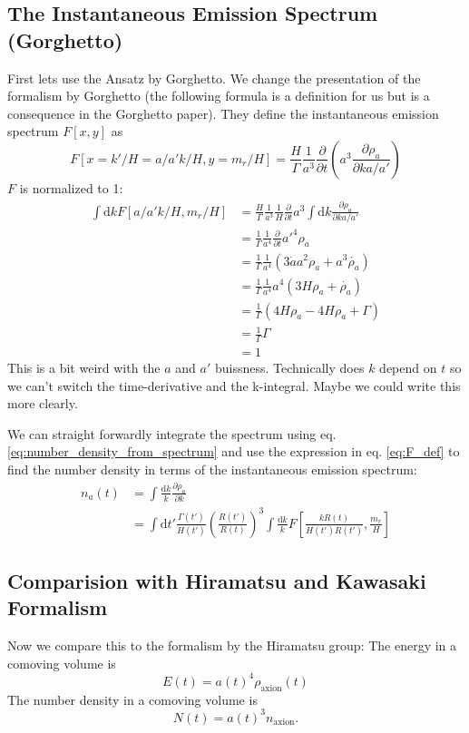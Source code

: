 \documentclass[a4paper]{article}
\begin{document}
\subsection{The Instantaneous Emission Spectrum (Gorghetto)}
First lets use the Ansatz by Gorghetto. 
We change the presentation of the formalism by Gorghetto (the following formula is a definition for us but is a consequence in the Gorghetto paper).
They define the instantaneous emission spectrum $F[x,y]$ as
\begin{equation}
	\label{eq:F_def}
	F[x = k' / H = a/a' k / H, y = m_r / H] = \frac{H}{\Gamma} \frac{1}{a^3} \frac{\partial}{\partial t} \left( a^3 \frac{\partial \rho_a}{\partial k a / a'} \right)
\end{equation}
$F$ is normalized to 1:
\begin{align}
	\int \mathrm{d} k F[a/a'k/H, m_r/H] &= \frac{H}{\Gamma} \frac{1}{a^3} \frac{1}{H} \frac{\partial}{\partial t} a^3 \int \mathrm{d} k \frac{\partial \rho_a}{\partial k a / a'} \\
	&= \frac{1}{\Gamma} \frac{1}{a^4} \frac{\partial}{\partial t} a'^4 \rho_a \\
	&= \frac{1}{\Gamma} \frac{1}{a^4} (3 \dot{a} a^2 \rho_a + a^3 \dot{\rho_a}) \\
	&= \frac{1}{\Gamma} \frac{1}{a^4} a^4 (3 H \rho_a + \dot{\rho_a}) \\
	&= \frac{1}{\Gamma} (4 H \rho_a - 4 H \rho_a + \Gamma) \\
	&= \frac{1}{\Gamma} \Gamma \\
	&= 1
\end{align}
This is a bit weird with the $a$ and $a'$ buissness.
Technically does $k$ depend on $t$ so we can't switch the time-derivative and the k-integral.
Maybe we could write this more clearly.

We can straight forwardly integrate the spectrum using eq. \eqref{eq:number_density_from_spectrum}  and use the expression in eq. \eqref{eq:F_def} to find the number density in terms of the instantaneous emission spectrum:
\begin{align}
	\label{eq:number_density_from_F}
	n_a(t) &= \int \frac{\mathrm{d} k}{k} \frac{\partial \rho_a}{\partial k} \\
	&= \int \mathrm{d} t' \frac{\Gamma(t')}{H(t')} \left(\frac{R(t')}{R(t)}\right)^3 \int \frac{\mathrm{d} k}{k} F\left[\frac{kR(t)}{H(t')R(t')}, \frac{m_r}{H}\right]
\end{align}

\subsection{Comparision with Hiramatsu and Kawasaki Formalism}
Now we compare this to the formalism by the Hiramatsu group:
The energy in a comoving volume is
\begin{equation}
	E(t) = a(t)^4 \rho_\mathrm{axion}(t)
\end{equation}
The number density in a comoving volume is
\begin{equation}
	N(t) = a(t)^3 n_\mathrm{axion}.
\end{equation}
\end{document}

